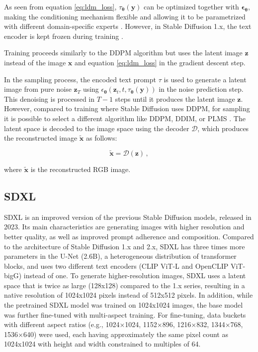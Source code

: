 As seen from equation \ref{eq:ldm_loss}, $\tau_{\boldsymbol{\theta}}(\mathbf{y})$ can be optimized together with $\boldsymbol{\epsilon}_{\boldsymbol{\theta}}$, making the conditioning mechanism flexible and allowing it to be parametrized with different domain-specific experts \cite{rombach2022highresolutionimagesynthesislatent}. However, in Stable Diffusion 1.x, the text encoder is kept frozen during training \cite{stable-diffusion-github}.

Training proceeds similarly to the DDPM algorithm but uses the latent image $\mathbf{z}$ instead of the image $\mathbf{x}$ and equation \ref{eq:ldm_loss} in the gradient descent step. \cite{rombach2022highresolutionimagesynthesislatent}

In the sampling process, the encoded text prompt $\tau$ is used to generate a latent image from pure noise $\mathbf{z}_T$ using $\epsilon_{\boldsymbol{\theta}}\left(\mathbf{z}_{t}, t, \tau_{\boldsymbol{\theta}}(\mathbf{y})\right)$ in the noise prediction step. This denoising is processed in $T-1$ steps until it produces the latent image $\mathbf{z}$. However, compared to training where Stable Diffusion uses DDPM, for sampling it is possible to select a different algorithm like DDPM, DDIM, or PLMS \cite{stable-diffusion-github}. The latent space is decoded to the image space using the decoder $\mathcal{D}$, which produces the reconstructed image $\tilde{\mathbf{x}}$ as follows:

\begin{equation}
\tilde{\mathbf{x}}=\mathcal{D}(\mathbf{z}) \,,
\end{equation}

where $\tilde{\mathbf{x}}$ is the reconstructed RGB image. \cite{rombach2022highresolutionimagesynthesislatent}


 \subsection{SDXL}
 \label{sec:sdxl}
SDXL is an improved version of the previous Stable Diffusion models, released in 2023. Its main characteristics are generating images with higher resolution and better quality, as well as improved prompt adherence and composition. Compared to the architecture of Stable Diffusion 1.x and 2.x, SDXL has three times more parameters in the U-Net (2.6B), a heterogeneous distribution of transformer blocks, and uses two different text encoders (CLIP ViT-L and OpenCLIP ViT-bigG) instead of one. To generate higher-resolution images, SDXL uses a latent space that is twice as large (128x128) compared to the 1.x series, resulting in a native resolution of 1024x1024 pixels instead of 512x512 pixels. In addition, while the pretrained SDXL model was trained on 1024x1024 images, the base model was further fine-tuned with multi-aspect training. For fine-tuning, data buckets with different aspect ratios (e.g., 1024×1024, 1152×896, 1216×832, 1344×768, 1536×640) were used, each having approximately the same pixel count as 1024x1024 with height and width constrained to multiples of 64. \cite{podell2023sdxlimprovinglatentdiffusion}

